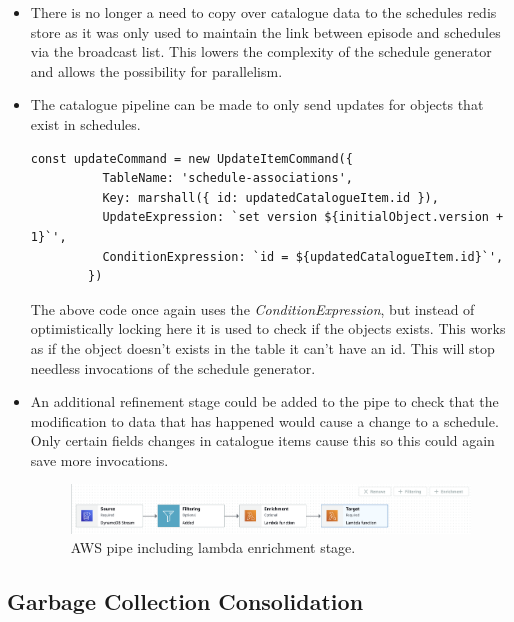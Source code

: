   \begin{itemize}
    \item There is no longer a need to copy over catalogue data to the schedules redis store as it was only used to maintain the link between episode and 
    schedules via the broadcast list. This lowers the complexity of the schedule generator and allows the possibility for parallelism.
    \item The catalogue pipeline can be made to only send updates for objects that exist in schedules. 
      \begin{lstlisting}[caption=SDK command sent by catalogue pipeline to ignore non schedule related catalogue items.]
        const updateCommand = new UpdateItemCommand({
          TableName: 'schedule-associations',
          Key: marshall({ id: updatedCatalogueItem.id }),
          UpdateExpression: `set version ${initialObject.version + 1}`',
          ConditionExpression: `id = ${updatedCatalogueItem.id}`',
        })
      \end{lstlisting} 
      The above code once again uses the \emph{ConditionExpression}, but instead of optimistically locking here it is used to check if the objects exists.
      This works as if the object doesn't exists in the table it can't have an id. This will stop needless invocations of the schedule generator.
    \item An additional refinement stage could be added to the pipe to check that the modification to data that has happened would cause a change to a
    schedule. Only certain fields changes in catalogue items cause this so this could again save more invocations.
  
      \begin{figure}[H]
        \centering
        \includegraphics[width=12cm]{assets/awsPipeFull.png}
        \caption{AWS pipe including lambda enrichment stage.}
        \label{fig:awsPipeFull}
      \end{figure}
  \end{itemize}

  \newpage
  \subsection{Garbage Collection Consolidation}
  \label{sec:garbageCollectorConsolidation}

